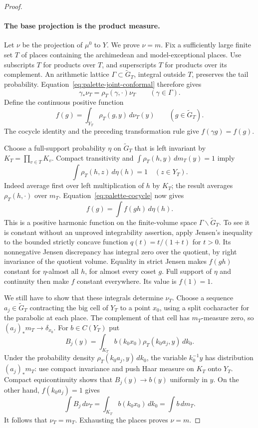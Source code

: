 \begin{proof}
\paragraph{The base projection is the product measure.}
Let $\nu$ be the projection of $\mu^0$ to $Y$. We prove $\nu=m$.
Fix a sufficiently large finite set $T$ of places containing the
archimedean and model-exceptional places. Use subscripts $T$ for products
over $T$, and superscripts $T$ for products over its complement.
An arithmetic lattice $\Gamma\subset\widetilde G_T$, integral outside
$T$, preserves the tail probability. Equation~\ref{eq:palette-joint-conformal}
therefore gives
\[
 \gamma_*\nu_T=\rho_T(\gamma,\cdot)\nu_T
 \qquad(\gamma\in\Gamma).
\]
Define the continuous positive function
\[
 f(g)=\int_{Y_T}\rho_T(g,y)\,d\nu_T(y)
 \qquad(g\in\widetilde G_T).
\]
The cocycle identity and the preceding transformation rule give
$f(\gamma g)=f(g)$.

Choose a full-support probability $\eta$ on $\widetilde G_T$ that is
left invariant by $K_T=\prod_{v\in T}K_v$. Compact transitivity and
$\int\rho_T(h,y)\,dm_T(y)=1$ imply
\[
 \int\rho_T(h,z)\,d\eta(h)=1\quad(z\in Y_T).
\]
Indeed average first over left multiplication of $h$ by $K_T$; the
result averages $\rho_T(h,\cdot)$ over $m_T$.
Equation~\ref{eq:palette-cocycle} now gives
\[
 f(g)=\int f(gh)\,d\eta(h).
\]
This is a positive harmonic function on the finite-volume space
$\Gamma\backslash\widetilde G_T$.
To see it is constant without an unproved integrability assertion, apply
Jensen's inequality to the bounded strictly concave function
$q(t)=t/(1+t)$ for $t>0$. Its nonnegative Jensen discrepancy has integral
zero over the quotient, by right invariance of the quotient volume.
Equality in strict Jensen makes $f(gh)$ constant for $\eta$-almost all
$h$, for almost every coset $g$. Full support of $\eta$ and continuity
then make $f$ constant everywhere. Its value is $f(1)=1$.

We still have to show that these integrals determine $\nu_T$.
Choose a sequence $a_j\in\widetilde G_T$ contracting the big cell of
$Y_T$ to a point $x_0$, using a split cocharacter for the parabolic at
each place. The complement of that cell has $m_T$-measure zero, so
$(a_j)_*m_T\to\delta_{x_0}$. For $b\in C(Y_T)$ put
\[
 B_j(y)=\int_{K_T}b(k_0x_0)\rho_T(k_0a_j,y)\,dk_0.
\]
Under the probability density $\rho_T(k_0a_j,y)\,dk_0$, the variable
$k_0^{-1}y$ has distribution $(a_j)_*m_T$: use compact invariance and
push Haar measure on $K_T$ onto $Y_T$. Compact equicontinuity shows that
$B_j(y)\to b(y)$ uniformly in $y$. On the other hand, $f(k_0a_j)=1$
gives
\[
 \int B_j\,d\nu_T
 =\int_{K_T}b(k_0x_0)\,dk_0
 =\int b\,dm_T.
\]
It follows that $\nu_T=m_T$. Exhausting the places proves $\nu=m$.


\end{proof}
